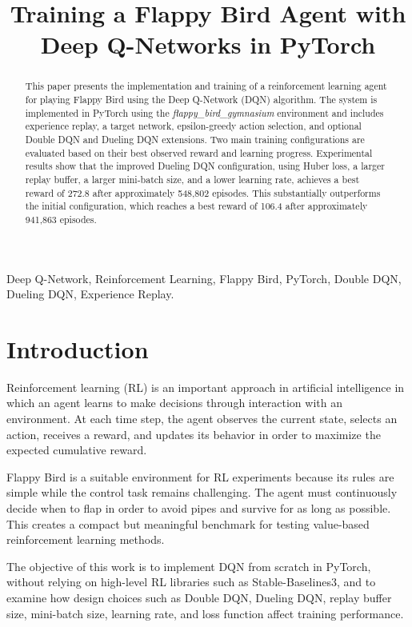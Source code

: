 \documentclass[conference]{IEEEtran}
\title{Training a Flappy Bird Agent with Deep Q-Networks in PyTorch}
\author{
\IEEEauthorblockN{Nguyen Vo Khang}
\IEEEauthorblockA{
Institution: \textit{Fill in your institution}\\
Email: \textit{Fill in your email}
}
}
\begin{document}
\maketitle

\begin{abstract}
This paper presents the implementation and training of a reinforcement learning agent for playing Flappy Bird using the Deep Q-Network (DQN) algorithm. The system is implemented in PyTorch using the \textit{flappy\_bird\_gymnasium} environment and includes experience replay, a target network, epsilon-greedy action selection, and optional Double DQN and Dueling DQN extensions. Two main training configurations are evaluated based on their best observed reward and learning progress. Experimental results show that the improved Dueling DQN configuration, using Huber loss, a larger replay buffer, a larger mini-batch size, and a lower learning rate, achieves a best reward of 272.8 after approximately 548,802 episodes. This substantially outperforms the initial configuration, which reaches a best reward of 106.4 after approximately 941,863 episodes.
\end{abstract}

\begin{IEEEkeywords}
Deep Q-Network, Reinforcement Learning, Flappy Bird, PyTorch, Double DQN, Dueling DQN, Experience Replay.
\end{IEEEkeywords}

\section{Introduction}
Reinforcement learning (RL) is an important approach in artificial intelligence in which an agent learns to make decisions through interaction with an environment. At each time step, the agent observes the current state, selects an action, receives a reward, and updates its behavior in order to maximize the expected cumulative reward.

Flappy Bird is a suitable environment for RL experiments because its rules are simple while the control task remains challenging. The agent must continuously decide when to flap in order to avoid pipes and survive for as long as possible. This creates a compact but meaningful benchmark for testing value-based reinforcement learning methods.

The objective of this work is to implement DQN from scratch in PyTorch, without relying on high-level RL libraries such as Stable-Baselines3, and to examine how design choices such as Double DQN, Dueling DQN, replay buffer size, mini-batch size, learning rate, and loss function affect training performance.
\end{document}
